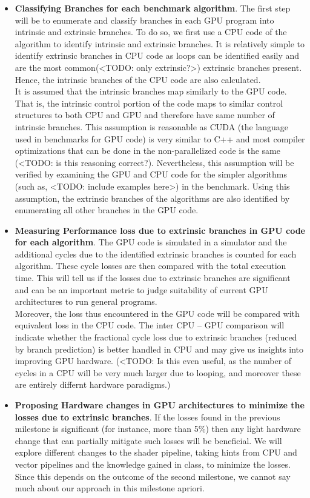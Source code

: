 \begin{itemize}

\item \textbf{Classifying Branches for each benchmark algorithm}. The first step will be to enumerate and classify branches in each GPU program into intrinsic and extrinsic branches. To do so, we first use a CPU code of the algorithm to identify intrinsic and extrinsic branches. It is relatively simple to identify extrinsic branches in CPU code as loops can be identified easily and are the most common(<TODO: only extrinsic?>) extrinsic branches present. Hence, the intrinsic branches of the CPU code are also calculated.
\\
It is assumed that the intrinsic branches map similarly to the GPU code. That is, the intrinsic control portion of the code maps to similar control structures to both CPU and GPU and therefore have same number of intrinsic branches. This assumption is reasonable as CUDA (the language used in benchmarks for GPU code) is very similar to C++ and most compiler optimizations that can be done in the non-parallelized code is the same (<TODO: is this reasoning correct?). Nevertheless, this assumption will be verified by examining the GPU and CPU code for the simpler algorithms (such as, <TODO: include examples here>) in the benchmark. Using this assumption, the extrinsic branches of the algorithms are also identified by enumerating all other branches in the GPU code.

\item \textbf{Measuring Performance loss due to extrinsic branches in GPU code for each algorithm}. The GPU code is simulated in a simulator and the additional cycles due to the identified extrinsic branches is counted for each algorithm. These cycle losses are then compared with the total execution time. This will tell us if the losses due to extrinsic branches are significant and can be an important metric to judge suitability of current GPU architectures to run general programs.
\\
Moreover, the loss thus encountered in the GPU code will be compared with equivalent loss in the CPU code. The inter CPU -- GPU comparison will indicate whether the fractional cycle loss due to extrinsic branches (reduced by branch prediction) is better handled in CPU and may give us insights into improving GPU hardware. (<TODO: Is this even useful, as the number of cycles in a CPU will be very much larger due to looping, and moreover these are entirely differnt hardware paradigms.)

\item \textbf{Proposing Hardware changes in GPU architectures to minimize the losses due to extrinsic branches}. If the losses found in the previous milestone is significant (for instance, more than 5\%) then any light hardware change that can partially mitigate such losses will be beneficial. We will explore different changes to the shader pipeline, taking hints from CPU and vector pipelines and the knowledge gained in class, to minimize the losses. Since this depends on the outcome of the second milestone, we cannot say much about our approach in this milestone apriori. 

\end{itemize}
